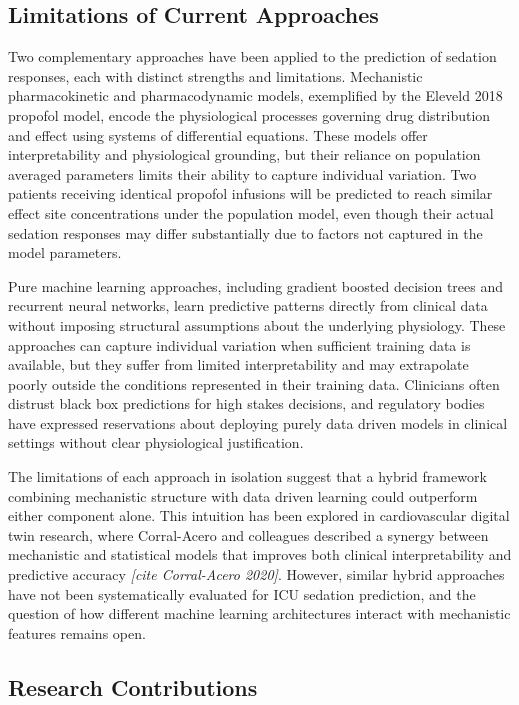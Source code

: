 \documentclass[11pt,a4paper]{article}
\newcommand{\placeholder}[1]{\textcolor{placeholdergray}{\textit{[#1]}}}
\begin{document}
\subsection{Limitations of Current Approaches}

Two complementary approaches have been applied to the prediction of
sedation responses, each with distinct strengths and limitations.
Mechanistic pharmacokinetic and pharmacodynamic models, exemplified
by the Eleveld 2018 propofol model, encode the physiological processes
governing drug distribution and effect using systems of differential
equations. These models offer interpretability and physiological
grounding, but their reliance on population averaged parameters limits
their ability to capture individual variation. Two patients receiving
identical propofol infusions will be predicted to reach similar effect
site concentrations under the population model, even though their actual
sedation responses may differ substantially due to factors not captured
in the model parameters.

Pure machine learning approaches, including gradient boosted decision
trees and recurrent neural networks, learn predictive patterns directly
from clinical data without imposing structural assumptions about the
underlying physiology. These approaches can capture individual variation
when sufficient training data is available, but they suffer from limited
interpretability and may extrapolate poorly outside the conditions
represented in their training data. Clinicians often distrust black box
predictions for high stakes decisions, and regulatory bodies have
expressed reservations about deploying purely data driven models in
clinical settings without clear physiological justification.

The limitations of each approach in isolation suggest that a hybrid
framework combining mechanistic structure with data driven learning
could outperform either component alone. This intuition has been
explored in cardiovascular digital twin research, where Corral-Acero
and colleagues described a synergy between mechanistic and statistical
models that improves both clinical interpretability and predictive
accuracy \placeholder{cite Corral-Acero 2020}. However, similar hybrid
approaches have not been systematically evaluated for ICU sedation
prediction, and the question of how different machine learning
architectures interact with mechanistic features remains open.

\subsection{Research Contributions}
\end{document}
